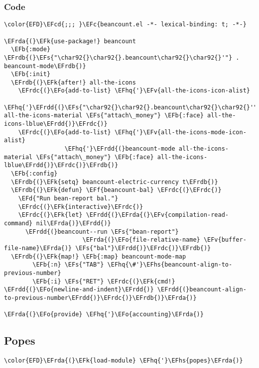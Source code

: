 \documentclass[a4wide,10pt]{article}
\newcommand{\EFc}[1]{\textcolor{EFc}{#1}} %
\newcommand{\EFcd}[1]{\textcolor{EFcd}{#1}} %
\newcommand{\EFs}[1]{\textcolor{EFs}{#1}} %
\newcommand{\EFd}[1]{\textcolor{EFd}{#1}} %
\newcommand{\EFk}[1]{\textcolor{EFk}{#1}} %
\newcommand{\EFb}[1]{\textcolor{EFb}{#1}} %
\newcommand{\EFf}[1]{\textcolor{EFf}{#1}} %
\newcommand{\EFv}[1]{\textcolor{EFv}{#1}} %
\newcommand{\EFo}[1]{\textcolor{EFo}{#1}} %
\newcommand{\EFhq}[1]{\textcolor{EFhq}{#1}} %
\newcommand{\EFhs}[1]{\textcolor{EFhs}{#1}} %
\newcommand{\EFrda}[1]{\textcolor{EFrda}{#1}} %
\newcommand{\EFrdb}[1]{\textcolor{EFrdb}{#1}} %
\newcommand{\EFrdc}[1]{\textcolor{EFrdc}{#1}} %
\newcommand{\EFrdd}[1]{\textcolor{EFrdd}{#1}} %
\begin{document}
\subsubsection{Code}
\label{sec:org729a71c}
\begin{Code}
\begin{Verbatim}
\color{EFD}\EFcd{;;; }\EFc{beancount.el -*- lexical-binding: t; -*-}

\EFrda{(}\EFk{use-package!} beancount
  \EFb{:mode} \EFrdb{(}\EFs{"\char92{}\char92{}.beancount\char92{}\char92{}'"} . beancount-mode\EFrdb{)}
  \EFb{:init}
  \EFrdb{(}\EFk{after!} all-the-icons
    \EFrdc{(}\EFo{add-to-list} \EFhq{'}\EFv{all-the-icons-icon-alist}
                 \EFhq{'}\EFrdd{(}\EFs{"\char92{}\char92{}.beancount\char92{}\char92{}'"} all-the-icons-material \EFs{"attach\_money"} \EFb{:face} all-the-icons-lblue\EFrdd{)}\EFrdc{)}
    \EFrdc{(}\EFo{add-to-list} \EFhq{'}\EFv{all-the-icons-mode-icon-alist}
                 \EFhq{'}\EFrdd{(}beancount-mode all-the-icons-material \EFs{"attach\_money"} \EFb{:face} all-the-icons-lblue\EFrdd{)}\EFrdc{)}\EFrdb{)}
  \EFb{:config}
  \EFrdb{(}\EFk{setq} beancount-electric-currency t\EFrdb{)}
  \EFrdb{(}\EFk{defun} \EFf{beancount-bal} \EFrdc{(}\EFrdc{)}
    \EFd{"Run bean-report bal."}
    \EFrdc{(}\EFk{interactive}\EFrdc{)}
    \EFrdc{(}\EFk{let} \EFrdd{(}\EFrda{(}\EFv{compilation-read-command} nil\EFrda{)}\EFrdd{)}
      \EFrdd{(}beancount--run \EFs{"bean-report"}
                      \EFrda{(}\EFo{file-relative-name} \EFv{buffer-file-name}\EFrda{)} \EFs{"bal"}\EFrdd{)}\EFrdc{)}\EFrdb{)}
  \EFrdb{(}\EFk{map!} \EFb{:map} beancount-mode-map
        \EFb{:n} \EFs{"TAB"} \EFhq{\#'}\EFhs{beancount-align-to-previous-number}
        \EFb{:i} \EFs{"RET"} \EFrdc{(}\EFk{cmd!} \EFrdd{(}\EFo{newline-and-indent}\EFrdd{)} \EFrdd{(}beancount-align-to-previous-number\EFrdd{)}\EFrdc{)}\EFrdb{)}\EFrda{)}

\EFrda{(}\EFo{provide} \EFhq{'}\EFo{accounting}\EFrda{)}
\end{Verbatim}
\end{Code}

\subsection{Popes}
\label{sec:org7b6b5fa}
\begin{Code}
\begin{Verbatim}
\color{EFD}\EFrda{(}\EFk{load-module} \EFhq{'}\EFhs{popes}\EFrda{)}
\end{Verbatim}
\end{Code}
\end{document}
